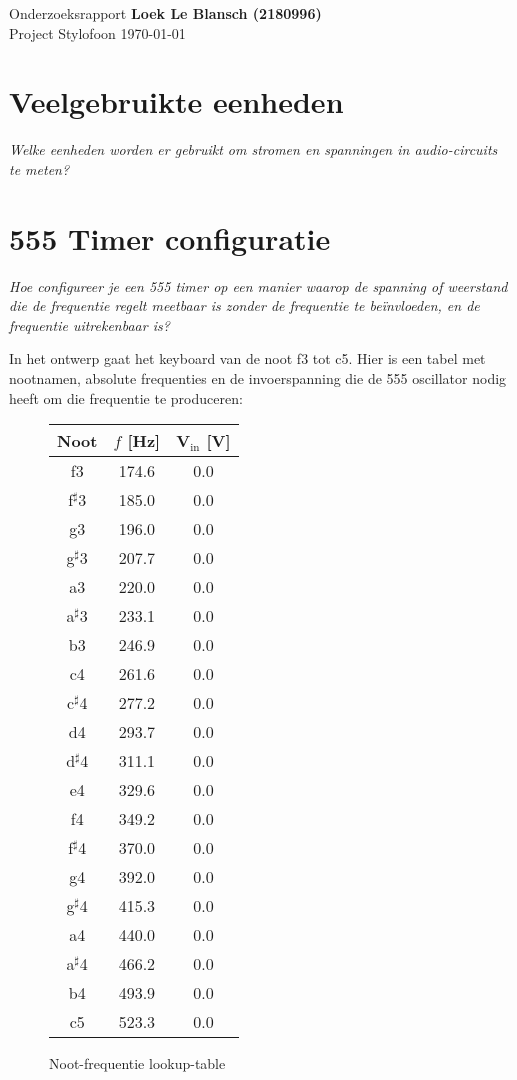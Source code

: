 \documentclass[12pt, a4paper, dutch]{article}
\newcommand{\s}{$^{\sharp}$}
\newcommand{\sub}[1]{$_{\text{#1}}$}
\begin{document}
Onderzoeksrapport \hfill \textbf{Loek Le Blansch (2180996)}\\
Project Stylofoon \hfill \today
\medskip

\tableofcontents

\section{Veelgebruikte eenheden}

\textit{Welke eenheden worden er gebruikt om stromen en spanningen in audio-circuits
te meten?}

\section{555 Timer configuratie}

\textit{Hoe configureer je een 555 timer op een manier waarop de spanning of
weerstand die de frequentie regelt meetbaar is zonder de frequentie te be\"invloeden,
en de frequentie uitrekenbaar is?}

In het ontwerp gaat het keyboard van de noot f3 tot c5. Hier is een tabel met
nootnamen, absolute frequenties en de invoerspanning die de 555 oscillator nodig
heeft om die frequentie te produceren:

\begin{figure}[H]
\centering
\begin{tabular}{ccc}
\toprule
Noot & $f$ [\si{\hertz}] & V\sub{in} [\si{\volt}]\\
\midrule
f3   & \num{174.6} & \num{0.0} \\
f\s3 & \num{185.0} & \num{0.0} \\
g3   & \num{196.0} & \num{0.0} \\
g\s3 & \num{207.7} & \num{0.0} \\
a3   & \num{220.0} & \num{0.0} \\
a\s3 & \num{233.1} & \num{0.0} \\
b3   & \num{246.9} & \num{0.0} \\
c4   & \num{261.6} & \num{0.0} \\
c\s4 & \num{277.2} & \num{0.0} \\
d4   & \num{293.7} & \num{0.0} \\
d\s4 & \num{311.1} & \num{0.0} \\
e4   & \num{329.6} & \num{0.0} \\
f4   & \num{349.2} & \num{0.0} \\
f\s4 & \num{370.0} & \num{0.0} \\
g4   & \num{392.0} & \num{0.0} \\
g\s4 & \num{415.3} & \num{0.0} \\
a4   & \num{440.0} & \num{0.0} \\
a\s4 & \num{466.2} & \num{0.0} \\
b4   & \num{493.9} & \num{0.0} \\
c5   & \num{523.3} & \num{0.0} \\
\bottomrule
\end{tabular}
\caption{Noot-frequentie lookup-table}
\end{figure}
\end{document}
